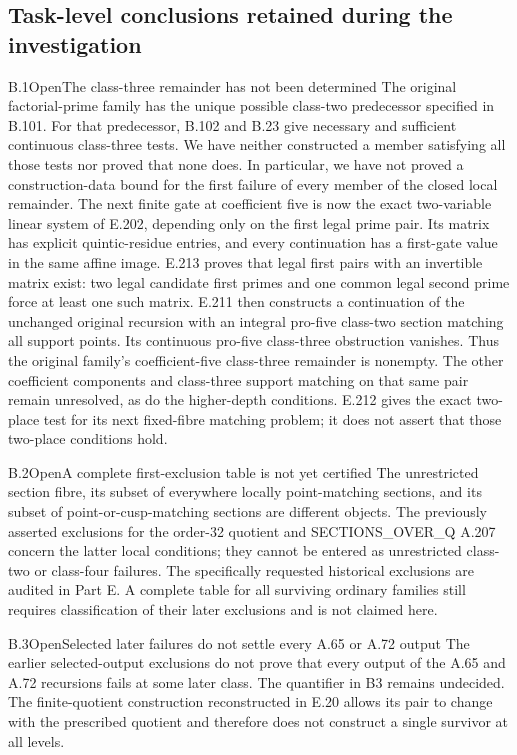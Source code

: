 \subsection{Task-level conclusions retained during the investigation}
\begin{result}{B.1}{Open}{The class-three remainder has not been determined}
The original factorial-prime family has the unique possible class-two
predecessor specified in B.101. For that predecessor, B.102 and B.23 give
necessary and sufficient continuous class-three tests. We have neither
constructed a member satisfying all those tests nor proved that none does.
In particular, we have not proved a construction-data bound for the first
failure of every member of the closed local remainder. The next finite
gate at coefficient five is now the exact two-variable linear system
of E.202, depending only on the first legal prime pair.  Its matrix has
explicit quintic-residue entries, and every continuation has a first-gate
value in the same affine image. E.213 proves that legal first pairs
with an invertible matrix exist: two legal candidate first primes and
one common legal second prime force at least one such matrix.
E.211 then constructs a continuation of the unchanged original
recursion with an integral pro-five class-two section matching all
support points. Its continuous pro-five class-three obstruction
vanishes. Thus the original family's coefficient-five class-three
remainder is nonempty. The other coefficient components and
class-three support matching on that same pair remain unresolved,
as do the higher-depth conditions. E.212 gives the exact two-place
test for its next fixed-fibre matching problem; it does not assert
that those two-place conditions hold.
\end{result}

\begin{result}{B.2}{Open}{A complete first-exclusion table is not yet certified}
The unrestricted section fibre, its subset of everywhere locally
point-matching sections, and its subset of point-or-cusp-matching sections
are different objects. The previously asserted exclusions for the
order-32 quotient and SECTIONS\_OVER\_Q A.207 concern the latter local
conditions; they cannot be entered as unrestricted class-two or class-four
failures. The specifically requested historical exclusions are audited
in Part E.  A complete table for all surviving ordinary families still
requires classification of their later exclusions and is not claimed here.
\end{result}

\begin{result}{B.3}{Open}{Selected later failures do not settle every A.65 or A.72 output}
The earlier selected-output exclusions do not prove that every output of
the A.65 and A.72 recursions fails at some later class. The quantifier in
B3 remains undecided. The finite-quotient construction reconstructed in
E.20 allows its pair to change with the prescribed quotient and therefore
does not construct a single survivor at all levels.
\end{result}

